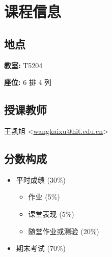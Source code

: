 \section*{课程信息} \label{课程信息}

\subsection{地点}
\textbf{教室:} T5204 \par
\textbf{座位:} 6 排 4 列

\subsection{授课教师}
王凯旭 <\href{mailto:wangkaixu@hit.edu.cn}{wangkaixu@hit.edu.cn}>

\subsection{分数构成}
\begin{itemize}
    \item 平时成绩 (30\%)
          \begin{itemize}
              \item 作业 (5\%)
              \item 课堂表现 (5\%)
              \item 随堂作业或测验 (20\%)
          \end{itemize}
    \item 期末考试 (70\%)
\end{itemize}
